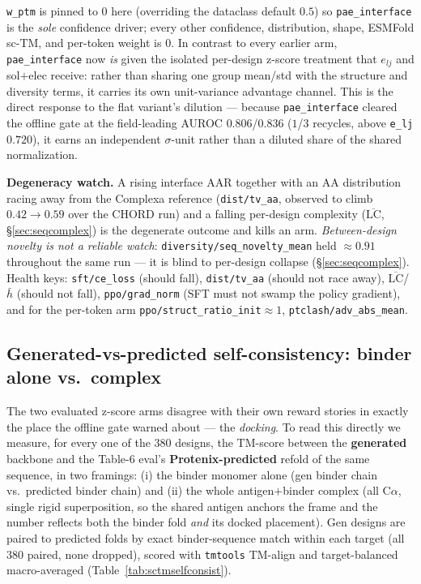 \documentclass[11pt]{article}
\newcommand{\ttk}[1]{\texttt{\small #1}}
\begin{document}
\ttk{w\_ptm} is pinned to $0$ here (overriding the dataclass default $0.5$) so \ttk{pae\_interface} is
the \emph{sole} confidence driver; every other confidence, distribution, shape, ESMFold sc-TM, and
per-token weight is $0$. In contrast to every earlier arm, \ttk{pae\_interface} now \emph{is} given the
isolated per-design z-score treatment that $e_{lj}$ and sol$+$elec receive: rather than sharing one
group mean/std with the structure and diversity terms, it carries its own unit-variance advantage
channel. This is the direct response to the flat variant's dilution --- because \ttk{pae\_interface}
cleared the offline gate at the field-leading AUROC $0.806$/$0.836$ ($1$/$3$ recycles, above \ttk{e\_lj}
$0.720$), it earns an independent $\sigma$-unit rather than a diluted share of the shared normalization.

\textbf{Degeneracy watch.} A rising interface AAR together with an AA distribution racing away from the
Complexa reference (\ttk{dist/tv\_aa}, observed to climb $0.42\!\to\!0.59$ over the CHORD run) and a
falling per-design complexity ($\overline{\mathrm{LC}}$, \S\ref{sec:seqcomplex}) is the degenerate
outcome and kills an arm. \emph{Between-design novelty is not a reliable watch}:
\ttk{diversity/seq\_novelty\_mean} held $\approx\!0.91$ throughout the same run --- it is blind to
per-design collapse (\S\ref{sec:seqcomplex}). Health keys: \ttk{sft/ce\_loss} (should fall),
\ttk{dist/tv\_aa} (should not race away), $\overline{\mathrm{LC}}$/$\bar h$ (should not fall),
\ttk{ppo/grad\_norm} (SFT must not swamp the policy gradient), and for the per-token arm
\ttk{ppo/struct\_ratio\_init}$\approx1$, \ttk{ptclash/adv\_abs\_mean}.

\subsection{Generated-vs-predicted self-consistency: binder alone vs.\ complex}
\label{sec:sctmselfconsist}
The two evaluated z-score arms disagree with their own reward stories in exactly the place the
offline gate warned about --- the \emph{docking}. To read this directly we measure, for every one of
the $380$ designs, the TM-score between the \textbf{generated} backbone and the Table-6 eval's
\textbf{Protenix-predicted} refold of the same sequence, in two framings: (i) the binder monomer alone
(gen binder chain vs.\ predicted binder chain) and (ii) the whole antigen$+$binder complex (all
C$\alpha$, single rigid superposition, so the shared antigen anchors the frame and the number reflects
both the binder fold \emph{and} its docked placement). Gen designs are paired to predicted folds by
exact binder-sequence match within each target (all $380$ paired, none dropped), scored with
\ttk{tmtools} TM-align and target-balanced macro-averaged (Table~\ref{tab:sctmselfconsist}).
\end{document}
